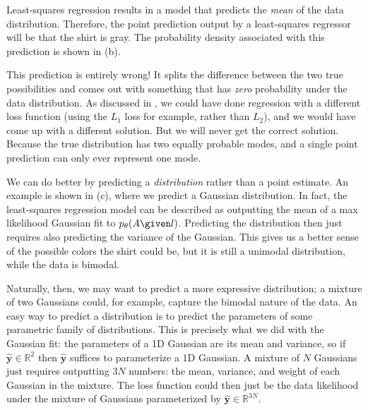 Least-squares regression results in a model that predicts the \textit{mean} of the data distribution. Therefore, the point prediction output by a least-squares regressor will be that the shirt is gray. The probability density associated with this prediction is shown in \fig{\ref{fig:conditional_generative_models:tshirts}}(b).

This prediction is entirely wrong! It splits the difference between the two true possibilities and comes out with something that has \textit{zero} probability under the data distribution. As discussed in \chap{\ref{chapter:probabilistic_graphical_models}}, we could have done regression with a different loss function (using the $L_1$ loss for example, rather than $L_2$), and we would have come up with a different solution. But we will never get the correct solution. Because the true distribution has two equally probable modes, and a single point prediction can only ever represent one mode.

We can do better by predicting a \textit{distribution} rather than a point estimate. An example is shown in \fig{\ref{fig:conditional_generative_models:tshirts}}(c), where we predict a Gaussian distribution. In fact, the least-squares regression model can be described as outputting the mean of a max likelihood Gaussian fit to $p_{\theta}(A \given l)$. Predicting the distribution then just requires also predicting the variance of the Gaussian. This gives us a better sense of the possible colors the shirt could be, but it is still a unimodal distribution, while the data is bimodal.

Naturally, then, we may want to predict a more expressive distribution; a mixture of two Gaussians could, for example, capture the bimodal nature of the data. An easy way to predict a distribution is to predict the parameters of some parametric family of distributions. This is precisely what we did with the Gaussian fit: the parameters of a 1D Gaussian are its mean and variance, so if $\hat{\mathbf{y}} \in \mathbb{R}^2$ then $\hat{\mathbf{y}}$ suffices to parameterize a 1D Gaussian. A mixture of $N$ Gaussians just requires outputting $3N$ numbers: the mean, variance, and weight of each Gaussian in the mixture. The loss function could then just be the data likelihood under the mixture of Gaussians parameterized by $\hat{\mathbf{y}} \in \mathbb{R}^{3N}$.

